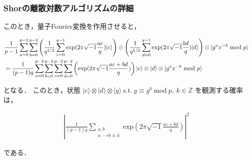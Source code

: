 \documentclass[dvipdfmx,12pt]{beamer}
\begin{document}
\begin{frame}

\frametitle{Shorの離散対数アルゴリズムの詳細}
    
このとき，量子Fourier変換を作用させると，\vspace{-15pt}

\scriptsize
\begin{align*}
    \displaystyle & \frac{1}{p - 1} \sum_{a = 0}^{p - 2} \sum_{b = 0}^{p - 2} \left( \frac{1}{q^{1/2}} \sum_{c = 0}^{q - 1} \mathrm{exp}( 2 \pi \sqrt{-1} \frac{ac}{q} ) | c \rangle \right) \otimes \left( \frac{1}{q^{1/2}} \sum_{d = 0}^{q - 1} \mathrm{exp}( 2 \pi \sqrt{-1} \frac{bd}{q} ) | d \rangle \right) \otimes | g^a x^{-b} \ \mathrm{mod} \ p \rangle \\
    \displaystyle & = \frac{1}{(p - 1)q} \sum_{a = 0}^{p - 2} \sum_{b = 0}^{p - 2} \sum_{c = 0}^{p - 2} \sum_{d = 0}^{p - 2} \left( \mathrm{exp}( 2 \pi \sqrt{-1} \frac{ac + bd}{q} ) \right) | c \rangle \otimes | d \rangle \otimes | g^a x^{-b} \ \mathrm{mod} \ p \rangle
\end{align*}

\normalsize
となる．
このとき，状態 $ | c \rangle \otimes | d \rangle \otimes | y \rangle \ \mathrm{s.t.} \ y \equiv g^k \ \mathrm{mod} \ p, \ k \in \mathbb{Z} $ を観測する確率は， \vspace{-15pt}

\begin{align*}
    \displaystyle \left| \frac{1}{(p - 1)q} \sum_{\substack{a, b \\ a - rb \equiv k}} \mathrm{exp} ( 2 \pi \sqrt{-1} \frac{ac + bd}{q} ) \right |^2 
\end{align*}

である．

\end{frame}
\end{document}
